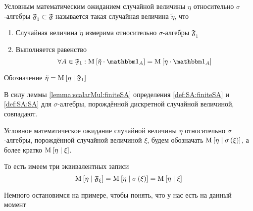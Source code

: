 \begin{definition}
  \label{def:SA:SA}
  Условным математическим ожиданием случайной величины $\eta$
  относительно $\sigma$-алгебры $\mathfrak{F}_1 \subset \mathfrak{F}$
  называется такая случайная величина $\tilde{\eta}$, что
  \begin{enumerate}
      \item Случайная величина $\tilde{\eta}$
      измерима относительно $\sigma$-алгебры $\mathfrak{F}_1$
      \item Выполняется равенство
      $$\forall A \in \mathfrak{F}_1:
      \Mean{ \tilde{\eta} \cdot \indicatorof{A} }
    = \Mean{ \eta \cdot \indicatorof{A} }$$
  \end{enumerate}
  Обозначение $\tilde{\eta} = \operatorname{M}_{} \left[  \eta \;\middle|\; \mathfrak{F}_1  \right]$

\end{definition}

\begin{remark}
  В силу леммы \ref{lemma:scalarMul:finiteSA} определения
  \ref{def:SA:finiteSA} и \ref{def:SA:SA} для $\sigma$-алгебры, порождённой
  дискретной случайной величиной, совпадают.
\end{remark}

\begin{remark}
  Условное математическое ожидание случайной величины $\eta$
  относительно $\sigma$-алгебры, порождённой случайной величиной $\xi$,
  будем обозначать $\operatorname{M}_{} \left[  \eta \;\middle|\; \sigma\left( \xi \right)  \right]$,
  а более кратко $\operatorname{M}_{} \left[  \eta \;\middle|\; \xi  \right]$.

  То есть имеем три эквивалентных записи
  $$\operatorname{M}_{} \left[  \eta \;\middle|\; \mathfrak{F}_{\xi}  \right]
      = \operatorname{M}_{} \left[  \eta \;\middle|\; \sigma\left( \xi \right)  \right]
      = \operatorname{M}_{} \left[  \eta \;\middle|\; \xi  \right]$$
\end{remark}

Немного остановимся на примере, чтобы понять, что у нас есть на данный момент

